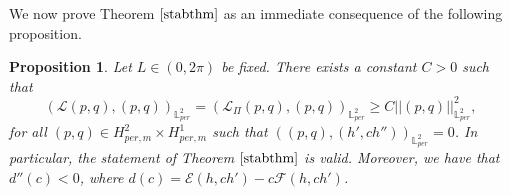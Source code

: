 \documentclass[12pt,reqno,a4paper]{amsart} %
\numberwithin{equation}{section}
\numberwithin{figure}{section}
\newtheorem{proposition}[theorem]{Proposition}
\begin{document}
We now prove Theorem $\ref{stabthm}$ as an immediate consequence of the following proposition.

\begin{proposition}\label{propstab}
Let $L\in (0,2\pi)$ be fixed. There exists a constant $C>0$ such that 
\begin{equation}\label{positiveL12}
(\mathcal{L}(p,q),(p,q))_{\mathbb{L}_{per}^2}=(\mathcal{L}_{\Pi}(p,q),(p,q))_{\mathbb{L}_{per}^2}\geq C||(p,q)||_{\mathbb{L}_{per}^2}^2,
\end{equation}
for all $(p,q)\in H_{per,m}^2\times H_{per,m}^1$ such that $((p,q),(h',ch''))_{\mathbb{L}_{per}^2}=0$. In particular, the statement of Theorem $\ref{stabthm}$ is valid. Moreover, we have that $d''(c)<0$, where $d(c)=\mathcal{E}(h,ch')-c\mathcal{F}(h,ch')$.
\end{proposition}
\end{document}
